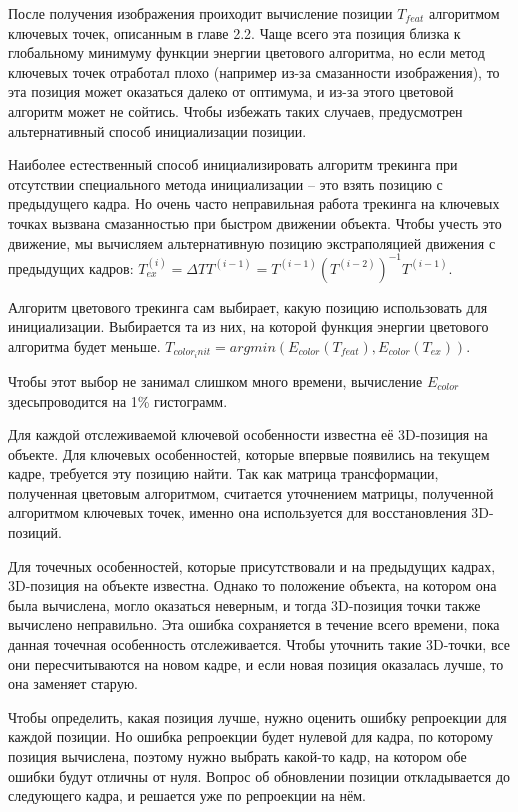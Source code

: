 После получения изображения проиходит вычисление позиции $T_{feat}$ алгоритмом
ключевых точек, описанным в главе 2.2. %
Чаще всего эта позиция близка к глобальному минимуму функции энергии цветового
алгоритма, но если метод ключевых точек отработал плохо (например из-за
смазанности изображения), то эта позиция может оказаться далеко от оптимума, и
из-за этого цветовой алгоритм может не сойтись.
Чтобы избежать таких случаев, предусмотрен альтернативный способ инициализации
позиции.

Наиболее естественный способ инициализировать алгоритм трекинга при отсутствии
специального метода инициализации -- это взять позицию с предыдущего кадра.
Но очень часто неправильная работа трекинга на ключевых точках вызвана
смазанностью при быстром движении объекта.
Чтобы учесть это движение, мы вычисляем альтернативную позицию экстраполяцией
движения с предыдущих кадров:
$
T^{(i)}_{ex} = \Delta T T^{(i - 1)} = T^{(i - 1)}(T^{(i - 2)})^{-1} T^{(i -
1)}$.

Алгоритм цветового трекинга сам выбирает, какую позицию использовать для
инициализации.
Выбирается та из них, на которой функция энергии цветового
алгоритма будет меньше.
$
    T_{color_init} = argmin(E_{color}(T_{feat}), E_{color}(T_{ex}))
$.

Чтобы этот выбор не занимал слишком много времени, вычисление $E_{color}$
здесьпроводится на 1\% гистограмм.

Для каждой отслеживаемой ключевой особенности известна её 3D-позиция на
объекте.
Для ключевых особенностей, которые впервые появились на текущем кадре,
требуется эту позицию найти.
Так как матрица трансформации, полученная цветовым алгоритмом, считается
уточнением матрицы, полученной алгоритмом ключевых точек, именно она
используется для восстановления 3D-позиций.


Для точечных особенностей, которые присутствовали и на предыдущих кадрах,
3D-позиция на объекте известна.
Однако то положение объекта, на котором она была вычислена, могло оказаться
неверным, и тогда 3D-позиция точки также вычислено неправильно.
Эта ошибка сохраняется в течение всего времени, пока данная точечная
особенность отслеживается.
Чтобы уточнить такие 3D-точки, все они пересчитываются на новом кадре, и если
новая позиция оказалась лучше, то она заменяет старую.

Чтобы определить, какая позиция лучше, нужно оценить ошибку репроекции для
каждой позиции.
Но ошибка репроекции будет нулевой для кадра, по которому позиция вычислена,
поэтому нужно выбрать какой-то кадр, на котором обе ошибки будут отличны от
нуля.
Вопрос об обновлении позиции откладывается до следующего кадра, и решается уже
по репроекции на нём.

